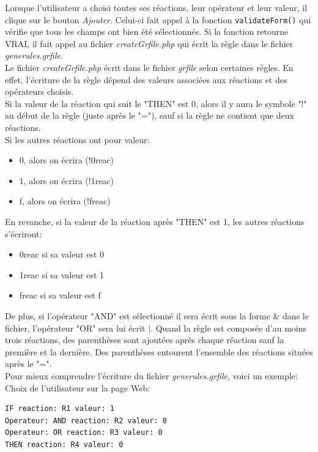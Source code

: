 Lorsque l'utilisateur a choisi toutes ses réactions, leur opérateur et leur valeur, il clique sur le bouton \emph{Ajouter}. Celui-ci fait appel à la fonction \texttt{validateForm()} qui vérifie que tous les champs ont bien été sélectionnés. Si la fonction retourne VRAI, il fait appel au fichier \emph{createGrfile.php} qui écrit la règle dans le fichier \emph{generules.grfile}.\\
Le fichier \emph{createGrfile.php} écrit dans le fichier \emph{grfile} selon certaines règles. En effet, l'écriture de la règle dépend des valeurs associées aux réactions et des opérateurs choisis.\\

Si la valeur de la réaction qui suit le "THEN" est 0, alors il y aura le symbole "!" au début de la règle (juste après le "="), sauf si la règle ne contient que deux réactions.\\
Si les autres réactions ont pour valeur:
\begin{itemize}
\item 0, alors on écrira (!0reac)
\item 1, alors on écrira (!1reac)
\item f, alors on écrira (!freac)
\end{itemize}
En revanche, si la valeur de la réaction après "THEN" est 1, les autres réactions s'écriront:
\begin{itemize}
\item 0reac si sa valeur est 0
\item 1reac si sa valeur est 1
\item freac si sa valeur est f
\end{itemize}
De plus, si l'opérateur "AND" est sélectionné il sera écrit sous la forme \& dans le fichier, l'opérateur "OR" sera lui écrit $|$. Quand la règle est composée d'au moins trois réactions, des parenthèses sont ajoutées après chaque réaction sauf la première et la dernière. Des parenthèses entourent l'ensemble des réactions situées après le "=".\\

Pour mieux comprendre l'écriture du fichier \emph{generules.grfile}, voici un exemple:\\

Choix de l'utilisateur sur la page Web: \\
\begin{DDbox}{\linewidth}
\begin{lstlisting}
IF reaction: R1 valeur: 1
Operateur: AND reaction: R2 valeur: 0
Operateur: OR reaction: R3 valeur: 0
THEN reaction: R4 valeur: 0
\end{lstlisting}
\end{DDbox}

